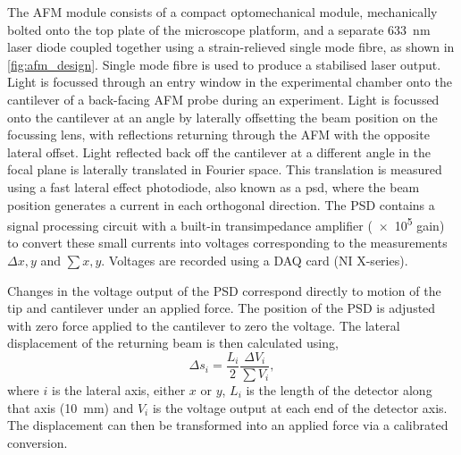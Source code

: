 \documentclass{article}
\begin{document}
The AFM module consists of a compact optomechanical module, mechanically bolted onto the top plate of the microscope platform, and a separate \SI{633}{nm} laser diode coupled together using a strain-relieved single mode fibre, as shown in \autoref{fig:afm_design}. Single mode fibre is used to produce a stabilised laser output.
Light is focussed through an entry window in the experimental chamber onto the cantilever of a back-facing AFM probe during an experiment. Light is focussed onto the cantilever at an angle by laterally offsetting the beam position on the focussing lens, with reflections returning through the AFM with the opposite lateral offset.%
Light reflected back off the cantilever at a different angle in the focal plane is laterally translated in Fourier space. This translation is measured using a fast lateral effect photodiode, also known as a \gls{psd}, where the beam position generates a current in each orthogonal direction. The PSD contains a signal processing circuit with a built-in transimpedance amplifier (\num{e5} gain) to convert these small currents into voltages corresponding to the measurements $\Delta x,y$ and $\sum x,y$. Voltages are recorded using a DAQ card (NI X-series).

Changes in the voltage output of the PSD correspond directly to motion of the tip and cantilever under an applied force. The position of the PSD is adjusted with zero force applied to the cantilever to zero the voltage. The lateral displacement of the returning beam is then calculated using,
\begin{equation}
\Delta s_i = \frac{L_i}{2}\frac{\Delta V_i}{\sum V_i},
\end{equation}
where $i$ is the lateral axis, either $x$ or $y$, $L_i$ is the length of the detector along that axis (\SI{10}{mm}) and $V_i$ is the voltage output at each end of the detector axis. The displacement can then be transformed into an applied force via a calibrated conversion.
\end{document}
